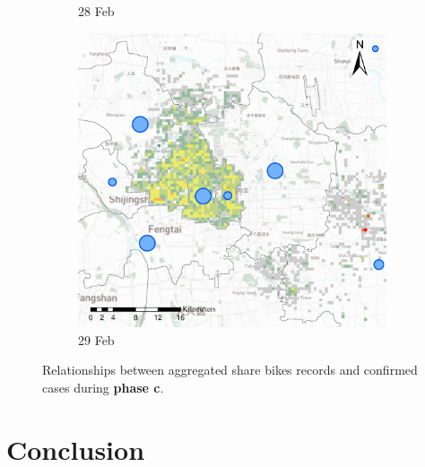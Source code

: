 \documentclass[preprints,ijgi,submit,moreauthors]{Definitions/mdpi}
\begin{document}
\begin{figure}[ht]
\begin{subfigure}{.3\textwidth}
        \caption{28 Feb}\label{fig:correlation_02_28}
    \end{subfigure}
    \begin{subfigure}{.3\textwidth}
        \includegraphics[width=\textwidth]{Figures/Relation_with_confrimed_cases/NewDistrictSSBD2020_02_29.eps}
        \caption{29 Feb}\label{fig:correlation_02_29}
    \end{subfigure}
    \caption{Relationships between aggregated share bikes records and confirmed cases during \textbf{phase c}.}
    \label{fig:BSS_phase_3}
\end{figure}


\section{Conclusion}
\end{document}
